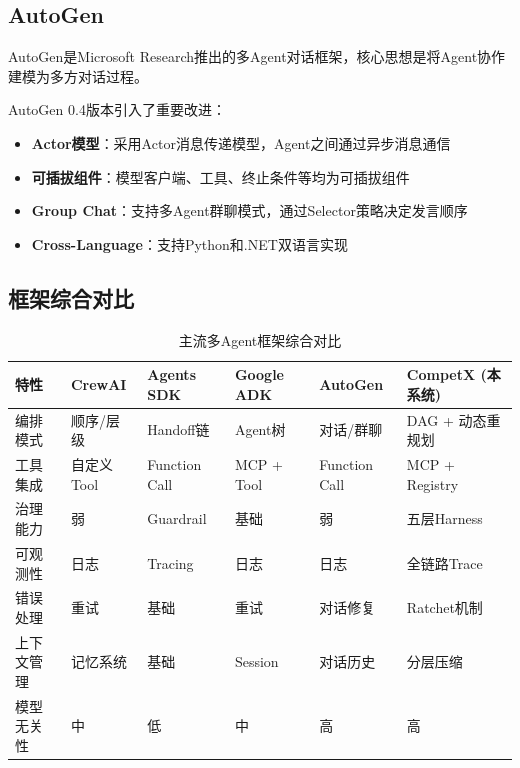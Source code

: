 \documentclass[12pt,a4paper]{ctexrep}
\begin{document}
\subsection{AutoGen}

AutoGen\cite{autogen2024}是Microsoft Research推出的多Agent对话框架，核心思想是将Agent协作建模为多方对话过程。

AutoGen 0.4版本引入了重要改进：

\begin{itemize}[leftmargin=2em]
\item \textbf{Actor模型}：采用Actor消息传递模型，Agent之间通过异步消息通信
\item \textbf{可插拔组件}：模型客户端、工具、终止条件等均为可插拔组件
\item \textbf{Group Chat}：支持多Agent群聊模式，通过Selector策略决定发言顺序
\item \textbf{Cross-Language}：支持Python和.NET双语言实现
\end{itemize}

\subsection{框架综合对比}

\begin{table}[H]
\centering
\caption{主流多Agent框架综合对比}
\label{tab:framework-compare}
{\small
\begin{tabular}{p{2.2cm} p{2cm} p{2cm} p{2cm} p{2cm} p{2.5cm}}
\toprule
\textbf{特性} & \textbf{CrewAI} & \textbf{Agents SDK} & \textbf{Google ADK} & \textbf{AutoGen} & \textbf{CompetX (本系统)} \\
\midrule
编排模式 & 顺序/层级 & Handoff链 & Agent树 & 对话/群聊 & DAG + 动态重规划 \\
\addlinespace
工具集成 & 自定义Tool & Function Call & MCP + Tool & Function Call & MCP + Registry \\
\addlinespace
治理能力 & 弱 & Guardrail & 基础 & 弱 & 五层Harness \\
\addlinespace
可观测性 & 日志 & Tracing & 日志 & 日志 & 全链路Trace \\
\addlinespace
错误处理 & 重试 & 基础 & 重试 & 对话修复 & Ratchet机制 \\
\addlinespace
上下文管理 & 记忆系统 & 基础 & Session & 对话历史 & 分层压缩 \\
\addlinespace
模型无关性 & 中 & 低 & 中 & 高 & 高 \\
\bottomrule
\end{tabular}
}
\end{table}
\end{document}
